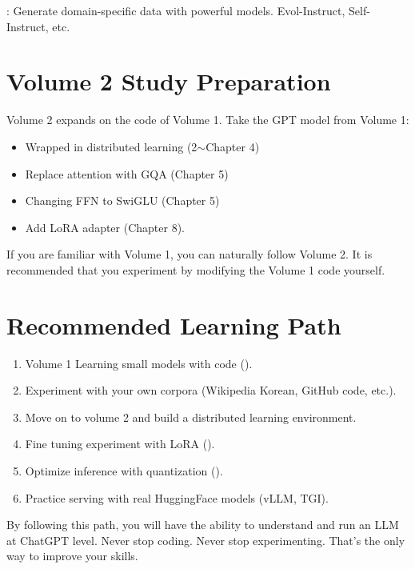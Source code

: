 : Generate domain-specific data with powerful models. Evol-Instruct, Self-Instruct, etc.

\section{Volume 2 Study Preparation}

Volume 2 expands on the code of Volume 1. Take the GPT model from Volume 1:
\begin{itemize}
\item Wrapped in distributed learning (2$\sim$Chapter 4)
\item Replace attention with GQA (Chapter 5)
\item Changing FFN to SwiGLU (Chapter 5)
\item Add LoRA adapter (Chapter 8).
\end{itemize}

If you are familiar with Volume 1, you can naturally follow Volume 2. It is recommended that you experiment by modifying the Volume 1 code yourself.

\section{Recommended Learning Path}

\begin{enumerate}
\item Volume 1 Learning small models with code ().
\item Experiment with your own corpora (Wikipedia Korean, GitHub code, etc.).
\item Move on to volume 2 and build a distributed learning environment.
\item Fine tuning experiment with LoRA ().
\item Optimize inference with quantization ().
\item Practice serving with real HuggingFace models (vLLM, TGI).
\end{enumerate}

By following this path, you will have the ability to understand and run an LLM at ChatGPT level. Never stop coding. Never stop experimenting. That's the only way to improve your skills.
